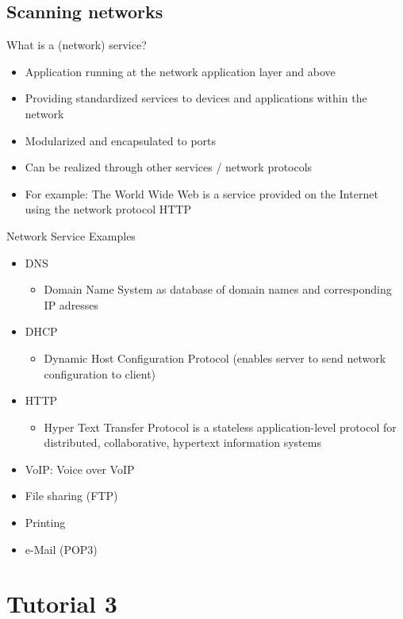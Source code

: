 \documentclass{article}
\begin{document}
\subsection{Scanning networks}
What is a (network) service?
\begin{itemize}
    \item Application running at the network application layer and above
    \item Providing standardized services to devices and applications within the network
    \item Modularized and encapsulated to ports
    \item Can be realized through other services / network protocols
    \item For example: The World Wide Web is a service provided on the Internet using the network protocol HTTP
\end{itemize}
Network Service Examples
\begin{itemize}
    \item DNS
          \begin{itemize}
              \item Domain Name System as database of domain names and corresponding IP adresses
          \end{itemize}
    \item DHCP
          \begin{itemize}
              \item Dynamic Host Configuration Protocol (enables server to send network configuration to client)
          \end{itemize}
    \item HTTP
          \begin{itemize}
              \item Hyper Text Transfer Protocol is a stateless application-level protocol for distributed, collaborative, hypertext information systems
          \end{itemize}
    \item VoIP: Voice over VoIP
    \item File sharing (FTP)
    \item Printing
    \item e-Mail (POP3)
\end{itemize}

\section{Tutorial 3}
\end{document}

